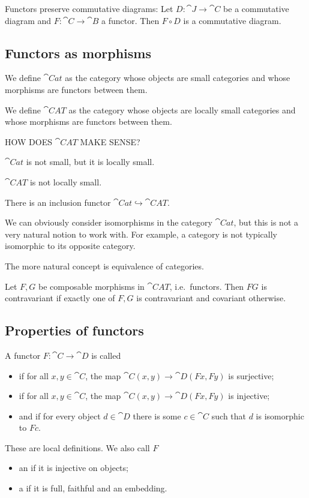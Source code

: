\begin{lemma}
Functors preserve commutative diagrams: Let $D:\cat{J}\to \cat{C}$ be a commutative diagram and $F:\cat{C}\to \cat{B}$ a functor. Then $F\circ D$ is a commutative diagram.
\end{lemma}

\subsection{Functors as morphisms}
\begin{definition}
We define $\cat{Cat}$ as the category whose objects are small categories and whose morphisms are functors between them.

We define $\cat{CAT}$ as the category whose objects are locally small categories and whose morphisms are functors between them.
\end{definition}
HOW DOES $\cat{CAT}$ MAKE SENSE?

\begin{lemma}
$\cat{Cat}$ is not small, but it is locally small.

$\cat{CAT}$ is not locally small.
\end{lemma}
There is an inclusion functor $\cat{Cat} \hookrightarrow \cat{CAT}$.

We can obviously consider isomorphisms in the category $\cat{Cat}$, but this is not a very natural notion to work with. For example, a category is not typically isomorphic to its opposite category.

The more natural concept is equivalence of categories.

\begin{lemma} \label{varianceOfComposite}
Let $F,G$ be composable morphisms in $\cat{CAT}$, i.e.\ functors. Then $FG$ is contravariant if exactly one of $F,G$ is contravariant and covariant otherwise.
\end{lemma}


\subsection{Properties of functors}
\begin{definition}
A functor $F:\cat{C}\to\cat{D}$ is called
\begin{itemize}
\item {} if for all $x,y\in \cat{C}$, the map $\cat{C}(x,y) \to \cat{D}(Fx,Fy)$ is surjective;
\item {} if for all $x,y\in \cat{C}$, the map $\cat{C}(x,y) \to \cat{D}(Fx,Fy)$ is injective;
\item and  if for every object $d\in\cat{D}$ there is some $c\in\cat{C}$ such that $d$ is isomorphic to $Fc$.
\end{itemize}
These are local definitions. We also call $F$
\begin{itemize}
\item an  if it is injective on objects;
\item a  if it is full, faithful and an embedding.
\end{itemize}
\end{definition}

